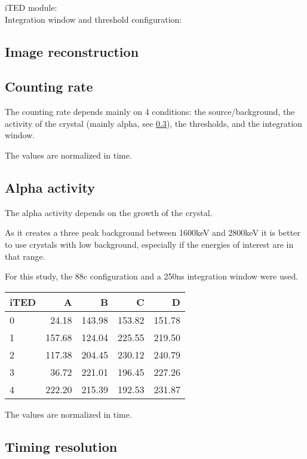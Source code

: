 iTED module:\\

Integration window and threshold configuration:\\

\subsection{Image reconstruction}

\subsection{Counting rate}

The counting rate depends mainly on 4 conditions: the source/background, the activity of the crystal (mainly alpha, see \ref{ssec:alpha}), the thresholds, and the integration window.


The values are normalized in time.

\subsection{Alpha activity}\label{ssec:alpha}

The alpha activity depends on the growth of the crystal.

As it creates a three peak background between 1600keV and 2800keV it is better to use crystals with low background, especially if the energies of interest are in that range.

For this study, the 88c configuration and a 250ns integration window were used.

\begin{tabular}{lrrrr}
    \toprule
    iTED &    A  &      B &     C  &     D \\
    \midrule
    0    & 24.18 & 143.98 & 153.82 &151.78 \\
    1    &157.68 & 124.04 & 225.55 &219.50 \\
    2    &117.38 & 204.45 & 230.12 &240.79 \\
    3    & 36.72 & 221.01 & 196.45 &227.26 \\
    4    &222.20 & 215.39 & 192.53 &231.87 \\
    \bottomrule
\end{tabular}

The values are normalized in time.

\subsection{Timing resolution}
